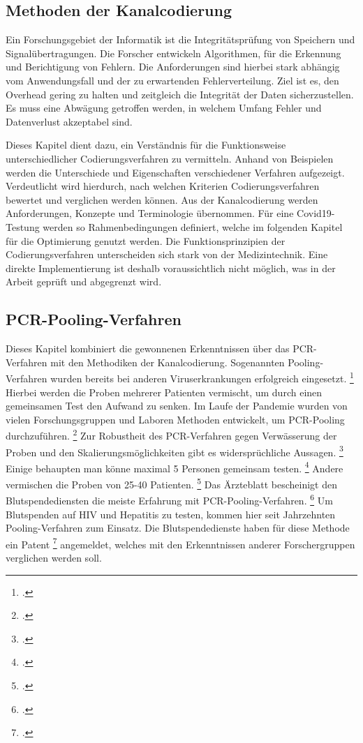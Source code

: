 \subsection{Methoden der Kanalcodierung}
Ein Forschungsgebiet der Informatik ist die Integritätsprüfung von Speichern und Signalübertragungen.
Die Forscher entwickeln Algorithmen, für die Erkennung und Berichtigung von Fehlern.
Die Anforderungen sind hierbei stark abhängig vom Anwendungsfall und der zu erwartenden Fehlerverteilung.
Ziel ist es, den Overhead gering zu halten und zeitgleich die Integrität der Daten sicherzustellen.
Es muss eine Abwägung getroffen werden, in welchem Umfang Fehler und Datenverlust akzeptabel sind.

Dieses Kapitel dient dazu, ein Verständnis für die Funktionsweise unterschiedlicher Codierungsverfahren zu vermitteln.
Anhand von Beispielen werden die Unterschiede und Eigenschaften verschiedener Verfahren aufgezeigt.
Verdeutlicht wird hierdurch, nach welchen Kriterien Codierungsverfahren bewertet und verglichen werden können.
Aus der Kanalcodierung werden Anforderungen, Konzepte und Terminologie übernommen.
Für eine Covid19-Testung werden so Rahmenbedingungen definiert, welche im folgenden Kapitel für die Optimierung genutzt werden.
Die Funktionsprinzipien der Codierungsverfahren unterscheiden sich stark von der Medizintechnik.
Eine direkte Implementierung ist deshalb voraussichtlich nicht möglich, was in der Arbeit geprüft und abgegrenzt wird.

\subsection{PCR-Pooling-Verfahren}
Dieses Kapitel kombiniert die gewonnenen Erkenntnissen über das PCR-Verfahren mit den Methodiken der Kanalcodierung.
Sogenannten Pooling-Verfahren wurden bereits bei anderen Viruserkrankungen erfolgreich eingesetzt.
\footcite{schlenger_pooling_2020}
Hierbei werden die Proben mehrerer Patienten vermischt, um durch einen gemeinsamen Test den Aufwand zu senken.
Im Laufe der Pandemie wurden von vielen Forschungsgruppen und Laboren Methoden entwickelt, um PCR-Pooling durchzuführen.
\footcite{Reddit Quelle}
Zur Robustheit des PCR-Verfahren gegen Verwässerung der Proben und den Skalierungsmöglichkeiten gibt es widersprüchliche Aussagen.
\footcite{Alternative Quelle Pooling}
Einige behaupten man könne maximal 5 Personen gemeinsam testen.
\footcite{Quelle}
Andere vermischen die Proben von 25-40 Patienten.
\footcite{Quelle}
Das Ärzteblatt bescheinigt den Blutspendediensten die meiste Erfahrung mit PCR-Pooling-Verfahren.
\footcite{schlenger_pooling_2020}
Um Blutspenden auf HIV und Hepatitis zu testen, kommen hier seit Jahrzehnten Pooling-Verfahren zum Einsatz.
Die Blutspendedienste haben für diese Methode ein Patent
\footcite{Patent Blutspende}
angemeldet, welches mit den Erkenntnissen anderer Forschergruppen verglichen werden soll.


